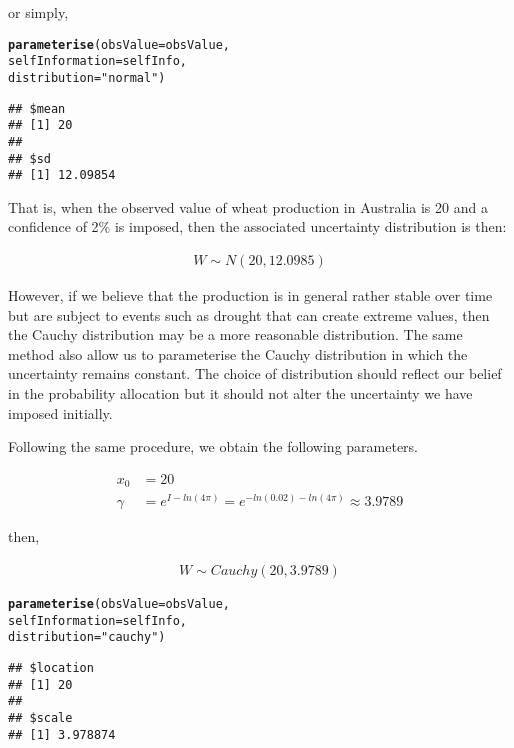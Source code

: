 \documentclass[nojss]{jss}\usepackage[]{graphicx}\usepackage[]{color}
\makeatletter
\newcommand{\hlstr}[1]{\textcolor[rgb]{0.192,0.494,0.8}{#1}}%
\newcommand{\hlstd}[1]{\textcolor[rgb]{0.345,0.345,0.345}{#1}}%
\newcommand{\hlkwc}[1]{\textcolor[rgb]{0.333,0.667,0.333}{#1}}%
\newcommand{\hlkwd}[1]{\textcolor[rgb]{0.737,0.353,0.396}{\textbf{#1}}}%
\newenvironment{kframe}{%
 \def\at@end@of@kframe{}%
 \ifinner\ifhmode%
  \def\at@end@of@kframe{\end{minipage}}%
  \begin{minipage}{\columnwidth}%
 \fi\fi%
 \def\FrameCommand##1{\hskip\@totalleftmargin \hskip-\fboxsep
 \colorbox{shadecolor}{##1}\hskip-\fboxsep
     \hskip-\linewidth \hskip-\@totalleftmargin \hskip\columnwidth}%
 \MakeFramed {\advance\hsize-\width
   \@totalleftmargin\z@ \linewidth\hsize
   \@setminipage}}%
 {\par\unskip\endMakeFramed%
 \at@end@of@kframe}
\newenvironment{knitrout}{}{} %
\makeatother
\begin{document}
or simply,

\begin{knitrout}
\color{fgcolor}\begin{kframe}
\begin{alltt}
\hlkwd{parameterise}\hlstd{(}\hlkwc{obsValue} \hlstd{= obsValue,}
             \hlkwc{selfInformation} \hlstd{= selfInfo,}
             \hlkwc{distribution} \hlstd{=} \hlstr{"normal"}\hlstd{)}
\end{alltt}
\begin{verbatim}
## $mean
## [1] 20
## 
## $sd
## [1] 12.09854
\end{verbatim}
\end{kframe}
\end{knitrout}

That is, when the observed value of wheat production in Australia is
20 and a confidence of 2\% is
imposed, then the associated uncertainty distribution is then:

\begin{align}
  W \sim N(20, 12.0985)\nonumber
\end{align}

However, if we believe that the production is in general rather stable
over time but are subject to events such as drought that can create
extreme values, then the Cauchy distribution may be a more reasonable
distribution. The same method also allow us to parameterise the Cauchy
distribution in which the uncertainty remains constant. The choice of
distribution should reflect our belief in the probability allocation
but it should not alter the uncertainty we have imposed initially.

Following the same procedure, we obtain the following parameters.


\begin{align}
  x_0 &= 20\nonumber\\ 
  \gamma &= e^{I - ln(4\pi)} = e^{-ln(0.02) - ln(4\pi)} \approx 3.9789\nonumber
\end{align}

then,

\begin{align}
  W \sim Cauchy(20, 3.9789)\nonumber
\end{align}



\begin{knitrout}
\color{fgcolor}\begin{kframe}
\begin{alltt}
\hlkwd{parameterise}\hlstd{(}\hlkwc{obsValue} \hlstd{= obsValue,}
             \hlkwc{selfInformation} \hlstd{= selfInfo,}
             \hlkwc{distribution} \hlstd{=} \hlstr{"cauchy"}\hlstd{)}
\end{alltt}
\begin{verbatim}
## $location
## [1] 20
## 
## $scale
## [1] 3.978874
\end{verbatim}
\end{kframe}
\end{knitrout}
\end{document}

